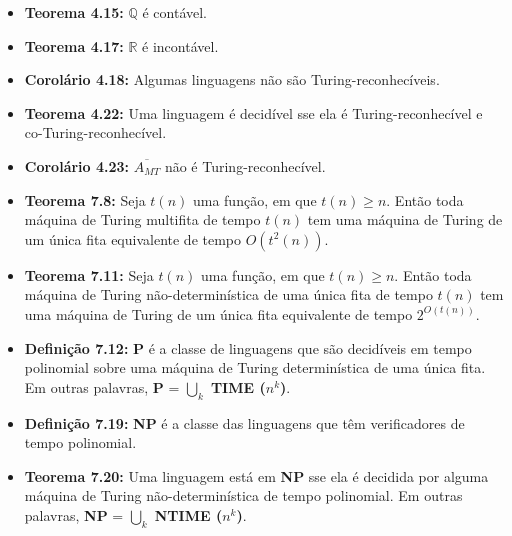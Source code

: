 \documentclass[12pt,a4paper,oneside]{article}
\begin{document}
\begin{itemize}
	\item[] {\bf Teorema 4.15:} $\mathbb{Q}$ é contável.
	\item[] {\bf Teorema 4.17:} $\mathbb{R}$ é incontável.
	\item[] {\bf Corolário 4.18:} Algumas linguagens não são Turing-reconhecíveis.
	\item[] {\bf Teorema 4.22:} Uma linguagem é decidível sse ela é Turing-reconhecível e co-Turing-reconhecível.
	\item[] {\bf Corolário 4.23:} $\overline{A_{MT}}$ não é Turing-reconhecível.
	\item[] {\bf Teorema 7.8: }
		Seja $t(n)$ uma função, em que $t(n) \geq n$. Então toda máquina de Turing multifita de tempo $t(n)$ tem uma máquina de Turing de um única fita equivalente de tempo $O(t^2(n))$.
	\item[] {\bf Teorema 7.11: }
		Seja $t(n)$ uma função, em que $t(n) \geq n$. Então toda máquina de Turing não-determinística de uma única fita de tempo $t(n)$ tem uma máquina de Turing de um única fita equivalente de tempo $2^{O(t(n))}$.	
	\item[] {\bf Definição 7.12: }
			{\bf P} é a classe de linguagens que são decidíveis em tempo polinomial sobre uma máquina de Turing determinística de uma única fita. Em outras palavras, {\bf P} = $\bigcup\limits_{k}$ {\bf TIME ($n^k$)}.
	\item[] {\bf Definição 7.19: }
			{\bf NP} é a classe das linguagens que têm verificadores de tempo polinomial.
	\item[] {\bf Teorema 7.20: }
			Uma linguagem está em {\bf NP} sse ela é decidida por alguma máquina de Turing não-determinística de tempo polinomial.  Em outras palavras, {\bf NP} = $\bigcup\limits_{k}$ {\bf NTIME ($n^k$)}.
\end{itemize}
\end{document}
